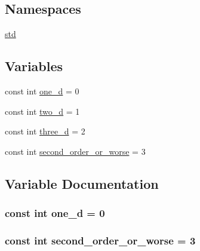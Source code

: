 \subsection*{Namespaces}
\begin{DoxyCompactItemize}
\item 
 \hyperlink{namespacestd}{std}
\end{DoxyCompactItemize}
\subsection*{Variables}
\begin{DoxyCompactItemize}
\item 
const int \hyperlink{tds_8hh_a88231a35b839c2381929e567f85b4a18}{one\+\_\+d} = 0
\item 
const int \hyperlink{tds_8hh_a3026d66c175dfab197999c3aa65f6b55}{two\+\_\+d} = 1
\item 
const int \hyperlink{tds_8hh_a8666c0e8e18ef6e03200f38bb07c551f}{three\+\_\+d} = 2
\item 
const int \hyperlink{tds_8hh_ab1496fd546727f3adb6f747b949ca321}{second\+\_\+order\+\_\+or\+\_\+worse} = 3
\end{DoxyCompactItemize}


\subsection{Variable Documentation}
\subsubsection[{\texorpdfstring{one\+\_\+d}{one_d}}]{\setlength{\rightskip}{0pt plus 5cm}const int one\+\_\+d = 0}\hypertarget{tds_8hh_a88231a35b839c2381929e567f85b4a18}{}\label{tds_8hh_a88231a35b839c2381929e567f85b4a18}
\subsubsection[{\texorpdfstring{second\+\_\+order\+\_\+or\+\_\+worse}{second_order_or_worse}}]{\setlength{\rightskip}{0pt plus 5cm}const int second\+\_\+order\+\_\+or\+\_\+worse = 3}\hypertarget{tds_8hh_ab1496fd546727f3adb6f747b949ca321}{}\label{tds_8hh_ab1496fd546727f3adb6f747b949ca321}
